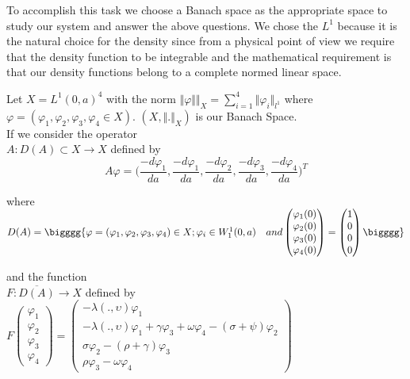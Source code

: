 To accomplish this task we choose a Banach space as the appropriate space to study our system and answer the above questions. We chose the $L^1$ because it is the natural choice for the density since from a physical point of view we require that the density function to be integrable and the mathematical requirement is that our density functions belong to a complete normed linear space.


 Let $X=L^{1}(0,a) ^4$ with the norm $\Vert \varphi \Vert\Vert_X=\sum_{i=1}^{4} \Vert \varphi_i\Vert_{l^1}$ where $\varphi=(\varphi_1, \varphi_2, \varphi_3,\varphi_4 \in X )$.
 $(X,\Vert. \Vert_X)$ is our Banach Space.\\
 
 If we consider the operator \\
 $A:D(A) \subset X \longrightarrow X$ defined by \\
 
 $$A \varphi = \bigg(\frac{-d \varphi_1}{da},\frac{-d \varphi_1}{da},\frac{-d \varphi_2}{da}, \frac{-d \varphi_3}{da}, \frac{-d \varphi_4}{da}\bigg)^T$$  
 
 where $D(A)=\bigggg\lbrace \varphi =(\varphi_1, \varphi_2, \varphi_3, \varphi_4) \in X; \varphi_i \in W_{1}^{1}(0,a)
\quad and  
\begin{pmatrix}
\varphi_{1} (0 )\\\varphi_{2} (0) \\ \varphi_{3} (0) \\ \varphi_{4} (0)
\end{pmatrix} =\begin{pmatrix}
1 \\ 0\\0\\0\\
\end{pmatrix} \bigggg\rbrace$

and the function\\
 $F :\overline{D(A)}\longrightarrow X $ defined by $F \begin{pmatrix}
\varphi_{1} \\ \varphi_{2} \\ \varphi_{3} \\ \varphi_{4}
\end{pmatrix}=\begin{pmatrix}
- \lambda (., \upsilon) \varphi_{1}\\ -\lambda(., \upsilon)\varphi_{1} + \gamma \varphi_{3} + \omega \varphi_{4}-(\sigma + \psi)\varphi_{2} \\ \sigma \varphi_{2}-(\rho + \gamma)\varphi_{3} \\ \rho \varphi_{3}-\omega \varphi_{4} \end{pmatrix} $

